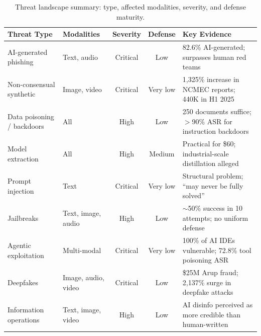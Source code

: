 
\begin{table}[htbp]
\centering
\caption{Threat landscape summary: type, affected modalities, severity, and defense maturity.}
\label{tab:threat-summary}
\scriptsize
\setlength{\tabcolsep}{4pt}
\renewcommand{\arraystretch}{0.92}
\begin{tabularx}{\textwidth}{l l c c X}
\toprule
\textbf{Threat Type} & \textbf{Modalities} & \textbf{Severity} & \textbf{Defense} & \textbf{Key Evidence} \\
\midrule
AI-generated phishing & Text, audio & Critical & Low & 82.6\% AI-generated; surpasses human red teams \\
Non-consensual synthetic & Image, video & Critical & Very low & 1,325\% increase in NCMEC reports; 440K in H1 2025 \\
Data poisoning / backdoors & All & High & Low & 250 documents suffice; $>$90\% ASR for instruction backdoors \\
Model extraction & All & High & Medium & Practical for \$60; industrial-scale distillation alleged \\
Prompt injection & Text & Critical & Very low & Structural problem; ``may never be fully solved'' \\
Jailbreaks & Text, image, audio & High & Low & $\sim$50\% success in 10 attempts; no uniform defense \\
Agentic exploitation & Multi-modal & Critical & Very low & 100\% of AI IDEs vulnerable; 72.8\% tool poisoning ASR \\
Deepfakes & Image, audio, video & Critical & Low & \$25M Arup fraud; 2,137\% surge in deepfake attacks \\
Information operations & Text, image, video & High & Low & AI disinfo perceived as more credible than human-written \\
\bottomrule
\end{tabularx}
\vspace{1pt}
\par{}
\end{table}
